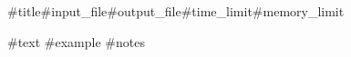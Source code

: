 \begin{problem}{#{title}}{#{input_file}}{#{output_file}}{#{time_limit}}{#{memory_limit}}{}

#{text}
\Examples
#{example}
#{notes}
\end{problem}
